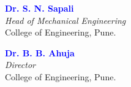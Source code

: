 \vfill
\begin{minipage}[t]{0.5\textwidth}%
\begin{flushleft}
\textcolor{blue}{\textbf{Dr. S. N. Sapali}}\\
\emph{Head of Mechanical Engineering}\\
College of Engineering, Pune.
\end{flushleft}
\end{minipage}\hspace{0.5cm}
\begin{minipage}[t]{0.4\textwidth}%
\begin{flushleft}
\textcolor{blue}{\textbf{Dr. B. B. Ahuja}}\\
\emph{Director}\\
College of Engineering, Pune.
\end{flushleft}

\end{minipage}